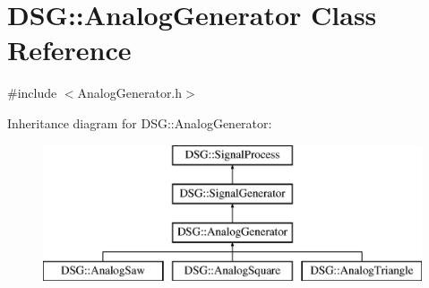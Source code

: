 \hypertarget{classDSG_1_1AnalogGenerator}{\section{D\+S\+G\+:\+:Analog\+Generator Class Reference}
\label{classDSG_1_1AnalogGenerator}
}


{\ttfamily \#include $<$Analog\+Generator.\+h$>$}

Inheritance diagram for D\+S\+G\+:\+:Analog\+Generator\+:\begin{figure}[H]
\begin{center}
\leavevmode
\includegraphics[height=4.000000cm]{classDSG_1_1AnalogGenerator}
\end{center}
\end{figure}
